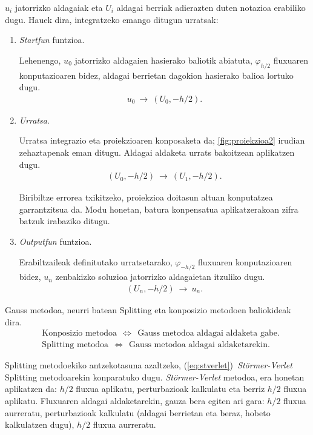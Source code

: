 $u_i$ jatorrizko aldagaiak eta $U_i$ aldagai berriak adierazten duten notazioa erabiliko dugu. Hauek dira, integratzeko emango ditugun urratsak:
\begin{enumerate}
\item \emph{Startfun} funtzioa.

Lehenengo, $u_0$ jatorrizko aldagaien hasierako baliotik abiatuta, $\varphi_{h/2}$ fluxuaren konputazioaren bidez, aldagai berrietan dagokion hasierako balioa lortuko dugu.
\begin{align*}
u_0 \ \rightarrow \ (U_0,-h/2).
\end{align*}

\item \emph{Urratsa}.

Urratsa integrazio eta proiekzioaren konposaketa da; \ref{fig:proiekzioa2} irudian zehaztapenak eman ditugu. Aldagai aldaketa urrats bakoitzean aplikatzen dugu.  
\begin{align*}
(U_0,-h/2) \ \rightarrow \ (U_1,-h/2).
\end{align*}

Biribiltze errorea txikitzeko, proiekzioa doitasun altuan konputatzea garrantzitsua da. Modu honetan, batura konpensatua aplikatzerakoan zifra batzuk irabaziko ditugu. 

\item \emph{Outputfun} funtzioa.

Erabiltzaileak definitutako urratsetarako, $\varphi_{-h/2}$ fluxuaren konputazioaren bidez, $u_n$ zenbakizko soluzioa jatorrizko aldagaietan  itzuliko dugu.
\begin{align*}
(U_n,-h/2) \ \rightarrow \ u_n.
\end{align*}


\end{enumerate}


Gauss metodoa, neurri batean  Splitting eta konposizio metodoen baliokideak dira. 
\begin{align*}
&\text{Konposizio metodoa} \ \ \Leftrightarrow \ \ \text{Gauss metodoa aldagai aldaketa gabe}.\\
&\text{Splitting metodoa}  \ \ \Leftrightarrow \ \  \text{Gauss metodoa aldagai aldaketarekin}.
\end{align*}

Splitting metodoekiko antzekotasuna azaltzeko, (\ref{eq:stverlet})~\emph{Störmer-Verlet} Splitting metodoarekin konparatuko dugu. \emph{Störmer-Verlet} metodoa, era honetan aplikatzen da: $h/2$ fluxua aplikatu, perturbazioak kalkulatu eta berriz  $h/2$ fluxua aplikatu. Fluxuaren aldagai aldaketarekin, gauza bera egiten ari gara: $h/2$ fluxua aurreratu, perturbazioak kalkulatu (aldagai berrietan eta beraz, hobeto kalkulatzen dugu), $h/2$ fluxua aurreratu. 


